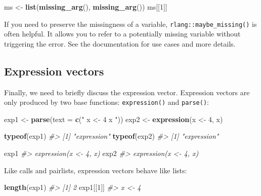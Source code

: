 \documentclass[]{book}
\newenvironment{Shaded}{\begin{snugshade}}{\end{snugshade}}
\newcommand{\CommentTok}[1]{\textcolor[rgb]{0.37,0.37,0.37}{\textit{#1}}}
\newcommand{\DataTypeTok}[1]{\textcolor[rgb]{0.27,0.27,0.27}{#1}}
\newcommand{\DecValTok}[1]{\textcolor[rgb]{0.06,0.06,0.06}{#1}}
\newcommand{\KeywordTok}[1]{\textcolor[rgb]{0.27,0.27,0.27}{\textbf{#1}}}
\newcommand{\NormalTok}[1]{#1}
\newcommand{\StringTok}[1]{\textcolor[rgb]{0.5,0.5,0.5}{#1}}
\begin{document}
\begin{Shaded}
\begin{Highlighting}[]
\NormalTok{ms <-}\StringTok{ }\KeywordTok{list}\NormalTok{(}\KeywordTok{missing_arg}\NormalTok{(), }\KeywordTok{missing_arg}\NormalTok{())}
\NormalTok{ms[[}\DecValTok{1}\NormalTok{]]}
\end{Highlighting}
\end{Shaded}

If you need to preserve the missingness of a variable, \texttt{rlang::maybe\_missing()} is often helpful. It allows you to refer to a potentially missing variable without triggering the error. See the documentation for use cases and more details.

\hypertarget{expression-vectors}{%
\subsection{Expression vectors}\label{expression-vectors}}


Finally, we need to briefly discuss the expression vector. Expression vectors are only produced by two base functions: \texttt{expression()} and \texttt{parse()}:

\begin{Shaded}
\begin{Highlighting}[]
\NormalTok{exp1 <-}\StringTok{ }\KeywordTok{parse}\NormalTok{(}\DataTypeTok{text =} \KeywordTok{c}\NormalTok{(}\StringTok{"}
\StringTok{x <- 4}
\StringTok{x}
\StringTok{"}\NormalTok{))}
\NormalTok{exp2 <-}\StringTok{ }\KeywordTok{expression}\NormalTok{(x <-}\StringTok{ }\DecValTok{4}\NormalTok{, x)}

\KeywordTok{typeof}\NormalTok{(exp1)}
\CommentTok{#> [1] "expression"}
\KeywordTok{typeof}\NormalTok{(exp2)}
\CommentTok{#> [1] "expression"}

\NormalTok{exp1}
\CommentTok{#> expression(x <- 4, x)}
\NormalTok{exp2}
\CommentTok{#> expression(x <- 4, x)}
\end{Highlighting}
\end{Shaded}

Like calls and pairlists, expression vectors behave like lists:

\begin{Shaded}
\begin{Highlighting}[]
\KeywordTok{length}\NormalTok{(exp1)}
\CommentTok{#> [1] 2}
\NormalTok{exp1[[}\DecValTok{1}\NormalTok{]]}
\CommentTok{#> x <- 4}
\end{Highlighting}
\end{Shaded}
\end{document}

